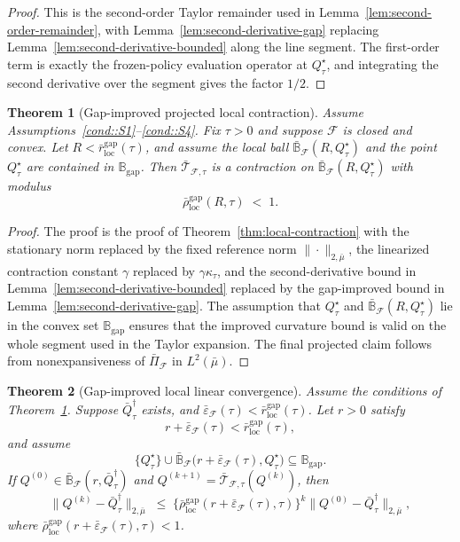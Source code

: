 \documentclass{article}
\theoremstyle{plain}
\newtheorem{theorem}{Theorem}
\theoremstyle{definition}
\theoremstyle{remark}
\begin{document}
\begin{proof}
This is the second-order Taylor remainder used in
Lemma~\ref{lem:second-order-remainder}, with
Lemma~\ref{lem:second-derivative-gap} replacing
Lemma~\ref{lem:second-derivative-bounded} along the line segment. The
first-order term is exactly the frozen-policy evaluation operator at
$Q^\star_\tau$, and integrating the second derivative over the segment gives
the factor $1/2$.
\end{proof}

\begin{theorem}[Gap-improved projected local contraction]
\label{thm:gap-local-contraction}
Assume Assumptions~\ref{cond::S1}--\ref{cond::S4}. Fix $\tau>0$ and suppose
$\mathcal F$ is closed and convex. Let
$R<\bar r_{\mathrm{loc}}^{\mathrm{gap}}(\tau)$, and assume the local ball
\(\bar{\mathbb B}_{\mathcal F}(R,Q^\star_\tau)\)
and the point $Q^\star_\tau$ are contained in $\mathbb B_{\mathrm{gap}}$. Then
$\bar{\mathcal T}_{\mathcal F,\tau}$ is a contraction on
$\bar{\mathbb B}_{\mathcal F}(R,Q^\star_\tau)$ with modulus
\[
\bar\rho_{\mathrm{loc}}^{\mathrm{gap}}(R,\tau)
\;<\;1.
\]
\end{theorem}

\begin{proof}
The proof is the proof of Theorem~\ref{thm:local-contraction} with the
stationary norm replaced by the fixed reference norm $\|\cdot\|_{2,\bar\mu}$,
the linearized contraction constant $\gamma$ replaced by
$\gamma\kappa_\tau$, and the second-derivative bound in
Lemma~\ref{lem:second-derivative-bounded} replaced by the gap-improved bound in
Lemma~\ref{lem:second-derivative-gap}. The assumption that $Q^\star_\tau$ and
$\bar{\mathbb B}_{\mathcal F}(R,Q^\star_\tau)$ lie in the convex set
$\mathbb B_{\mathrm{gap}}$ ensures that the improved curvature bound is valid on
the whole segment used in the Taylor expansion. The final projected claim
follows from nonexpansiveness of $\bar\Pi_{\mathcal F}$ in
$L^2(\bar\mu)$.
\end{proof}

\begin{theorem}[Gap-improved local linear convergence]
\label{thm:gap-local-linear}
Assume the conditions of Theorem~\ref{thm:gap-local-contraction}. Suppose
$\bar Q^\dagger_\tau$ exists, and
$\bar\varepsilon_{\mathcal F}(\tau)<\bar r_{\mathrm{loc}}^{\mathrm{gap}}(\tau)$. Let
\(r>0\) satisfy
\[
r+\bar\varepsilon_{\mathcal F}(\tau)
<
\bar r_{\mathrm{loc}}^{\mathrm{gap}}(\tau),
\]
and assume
\[
\{Q^\star_\tau\}
\cup
\bar{\mathbb B}_{\mathcal F}\bigl(
r+\bar\varepsilon_{\mathcal F}(\tau),Q^\star_\tau\bigr)
\subseteq
\mathbb B_{\mathrm{gap}}.
\]
If
$Q^{(0)}\in\bar{\mathbb B}_{\mathcal F}(r,\bar Q^\dagger_\tau)$ and
$Q^{(k+1)}=\bar{\mathcal T}_{\mathcal F,\tau}(Q^{(k)})$, then
\[
\|Q^{(k)}-\bar Q^\dagger_\tau\|_{2,\bar\mu}
\;\le\;
\bigl\{\bar\rho_{\mathrm{loc}}^{\mathrm{gap}}(r+\bar\varepsilon_{\mathcal F}(\tau),\tau)\bigr\}^{k}
\|Q^{(0)}-\bar Q^\dagger_\tau\|_{2,\bar\mu},
\]
where
\(\bar\rho_{\mathrm{loc}}^{\mathrm{gap}}(r+\bar\varepsilon_{\mathcal F}(\tau),\tau)<1\).
\end{theorem}
\end{document}
